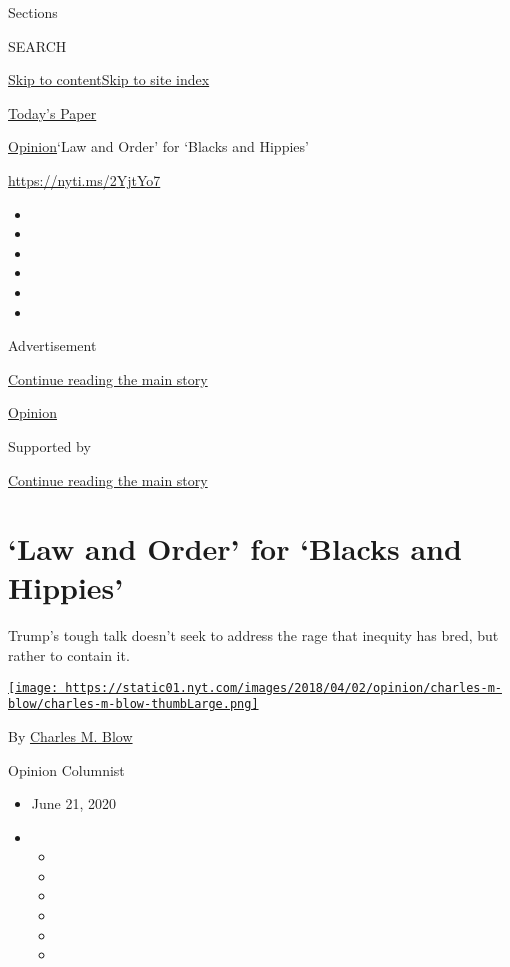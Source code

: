 Sections

SEARCH

\protect\hyperlink{site-content}{Skip to
content}\protect\hyperlink{site-index}{Skip to site index}

\href{https://myaccount.nytimes.com/auth/login?response_type=cookie\&client_id=vi}{}

\href{https://www.nytimes.com/section/todayspaper}{Today's Paper}

\href{/section/opinion}{Opinion}\textbar{}`Law and Order' for `Blacks
and Hippies'

\url{https://nyti.ms/2YjtYo7}

\begin{itemize}
\item
\item
\item
\item
\item
\item
\end{itemize}

Advertisement

\protect\hyperlink{after-top}{Continue reading the main story}

\href{/section/opinion}{Opinion}

Supported by

\protect\hyperlink{after-sponsor}{Continue reading the main story}

\hypertarget{law-and-order-for-blacks-and-hippies}{%
\section{`Law and Order' for `Blacks and
Hippies'}\label{law-and-order-for-blacks-and-hippies}}

Trump's tough talk doesn't seek to address the rage that inequity has
bred, but rather to contain it.

\href{https://www.nytimes.com/by/charles-m-blow}{\texttt{[image: https://static01.nyt.com/images/2018/04/02/opinion/charles-m-blow/charles-m-blow-thumbLarge.png]}}

By \href{https://www.nytimes.com/by/charles-m-blow}{Charles M. Blow}

Opinion Columnist

\begin{itemize}
\item
  June 21, 2020
\item
  \begin{itemize}
  \item
  \item
  \item
  \item
  \item
  \item
  \end{itemize}
\end{itemize}


